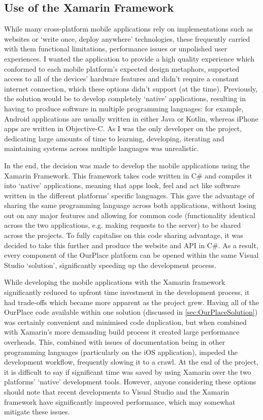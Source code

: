 \subsection{Use of the Xamarin Framework}
While many cross-platform mobile applications rely on implementations such as websites or `write once, deploy anywhere' technologies, these frequently carried with them functional limitations, performance issues or unpolished user experiences. I wanted the application to provide a high quality experience which conformed to each mobile platform's expected design metaphors, supported access to all of the devices' hardware features and didn't require a constant internet connection, which these options didn't support (at the time). Previously, the solution would be to develop completely `native' applications, resulting in having to produce software in multiple programming languages: for example, Android applications are usually written in either Java or Kotlin, whereas iPhone apps are written in Objective-C. As I was the only developer on the project, dedicating large amounts of time to learning, developing, iterating and maintaining systems across multiple languages was unrealistic. 

In the end, the decision was made to develop the mobile applications using the Xamarin Framework. This framework takes code written in C\# and compiles it into `native' applications, meaning that apps look, feel and act like software written in the different platforms' specific languages. This gave the advantage of sharing the same programming language across both applications, without losing out on any major features and allowing for common code (functionality identical across the two applications, e.g. making requests to the server) to be shared across the projects. To fully capitalise on this code sharing advantage, it was decided to take this further and produce the website and API in C\#. As a result, every component of the OurPlace platform can be opened within the same Visual Studio `solution', significantly speeding up the development process.

While developing the mobile applications with the Xamarin framework significantly reduced to upfront time investment in the development process, it had trade-offs which became more apparent as the project grew. Having all of the OurPlace code available within one solution (discussed in \ref{sec:OurPlaceSolution}) was certainly convenient and minimised code duplication, but when combined with Xamarin's more demanding build process it created large performance overheads. This, combined with issues of documentation being in other programming languages (particularly on the iOS application), impeded the development workflow, frequently slowing it to a crawl. At the end of the project, it is difficult to say if significant time was saved by using Xamarin over the two platforms' `native' development tools. However, anyone considering these options should note that recent developments to Visual Studio and the Xamarin framework have significantly improved performance, which may somewhat mitigate these issues.

